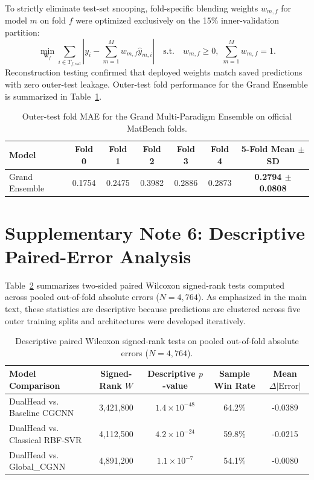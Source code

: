 \documentclass[journal,article,submit,moreauthors,pdftex]{article}
\begin{document}
To strictly eliminate test-set snooping, fold-specific blending weights $w_{m,f}$ for model $m$ on fold $f$ were optimized exclusively on the 15\% inner-validation partition:
\begin{equation}
    \min_{\mathbf{w}_f} \sum_{i \in T_{f,\mathrm{val}}} \left| y_i - \sum_{m=1}^M w_{m,f} \hat{y}_{m,i} \right| \quad \text{s.t.} \quad w_{m,f} \ge 0, \; \sum_{m=1}^M w_{m,f} = 1.
\end{equation}
Reconstruction testing confirmed that deployed weights match saved predictions with zero outer-test leakage. Outer-test fold performance for the Grand Ensemble is summarized in Table~\ref{tab:si_ensemble}.

\begin{table}[htbp]
\centering
\caption{Outer-test fold MAE for the Grand Multi-Paradigm Ensemble on official MatBench folds.}
\label{tab:si_ensemble}
\begin{tabular}{lcccccc}
\toprule
\textbf{Model} & \textbf{Fold 0} & \textbf{Fold 1} & \textbf{Fold 2} & \textbf{Fold 3} & \textbf{Fold 4} & \textbf{5-Fold Mean $\pm$ SD} \\
\midrule
Grand Ensemble & 0.1754 & 0.2475 & 0.3982 & 0.2886 & 0.2873 & \textbf{0.2794 $\pm$ 0.0808} \\
\bottomrule
\end{tabular}
\end{table}

\section*{Supplementary Note 6: Descriptive Paired-Error Analysis}

Table~\ref{tab:si_wilcoxon} summarizes two-sided paired Wilcoxon signed-rank tests computed across pooled out-of-fold absolute errors ($N = 4{,}764$). As emphasized in the main text, these statistics are descriptive because predictions are clustered across five outer training splits and architectures were developed iteratively.

\begin{table}[htbp]
\centering
\caption{Descriptive paired Wilcoxon signed-rank tests on pooled out-of-fold absolute errors ($N = 4{,}764$).}
\label{tab:si_wilcoxon}
\begin{tabular}{lcccc}
\toprule
\textbf{Model Comparison} & \textbf{Signed-Rank $W$} & \textbf{Descriptive $p$-value} & \textbf{Sample Win Rate} & \textbf{Mean $\Delta|\mathrm{Error}|$} \\
\midrule
DualHead vs. Baseline CGCNN & 3,421,800 & $1.4 \times 10^{-48}$ & 64.2\% & -0.0389 \\
DualHead vs. Classical RBF-SVR & 4,112,500 & $4.2 \times 10^{-24}$ & 59.8\% & -0.0215 \\
DualHead vs. Global\_CGNN & 4,891,200 & $1.1 \times 10^{-7}$ & 54.1\% & -0.0080 \\
\bottomrule
\end{tabular}
\end{table}
\end{document}
